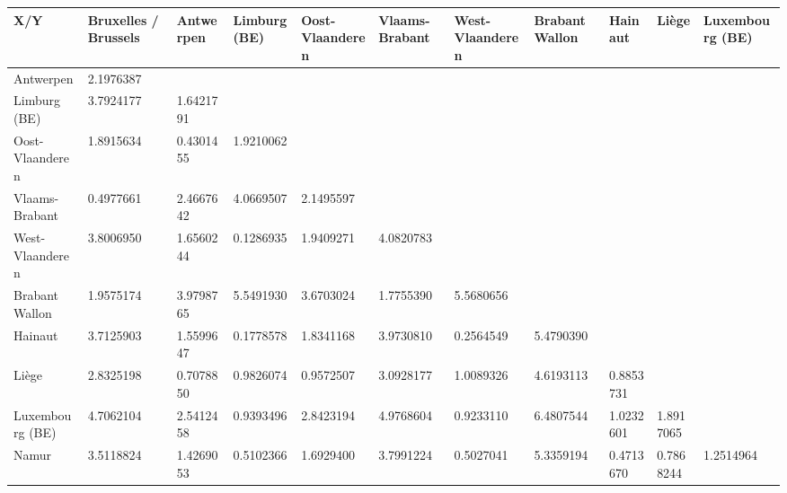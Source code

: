 \documentclass{article}
\begin{document}
\begin{tabularx}{18.4cm}{|X|X|X|X|X|X|X|X|X|X|X|}
	\hline
	X/Y                      &Bruxelles / Brussels&Antwerpen &Limburg (BE) &Oost-Vlaanderen &Vlaams-Brabant &West-Vlaanderen &Brabant Wallon &Hainaut &Liège &Luxembourg (BE)\\
	\hline
	Antwerpen                           &2.1976387 &&&&&&&&&\\                                                                                                                             
	\hline
	Limburg (BE)                        &3.7924177       &1.6421791&&&&&&&&\\                                                                                                                                                         
	\hline
	Oost-Vlaanderen                     &1.8915634       &0.4301455          &1.9210062&&&&&&&\\                                                                                                                                      
	\hline
	Vlaams-Brabant                      &0.4977661       &2.4667642          &4.0669507             &2.1495597&&&&&&\\                                                                                                                
	\hline
	West-Vlaanderen                     &3.8006950       &1.6560244          &0.1286935             &1.9409271            &4.0820783 &&&&&\\                                                                                           
	\hline
	Brabant Wallon                      &1.9575174       &3.9798765          &5.5491930            & 3.6703024            &1.7755390             &5.5680656                                                                     &&&&\\
	\hline
	Hainaut                             &3.7125903       &1.5599647          &0.1778578            & 1.8341168            &3.9730810             &0.2564549            &5.4790390                                                &&&\\
	\hline
	Liège                               &2.8325198       &0.7078850          &0.9826074            & 0.9572507            &3.0928177             &1.0089326            &4.6193113     &0.8853731                                  &&\\
	\hline
	Luxembourg (BE)                     &4.7062104       &2.5412458          &0.9393496             &2.8423194            &4.9768604             &0.9233110            &6.4807544     &1.0232601   &1.8917065                      &\\
	\hline
	Namur                         &3.5118824       &1.4269053          &0.5102366             &1.6929400            &3.7991224             &0.5027041            &5.3359194     &0.4713670   &0.7868244             &1.2514964\\
	\hline
\end{tabularx}
\end{document}

